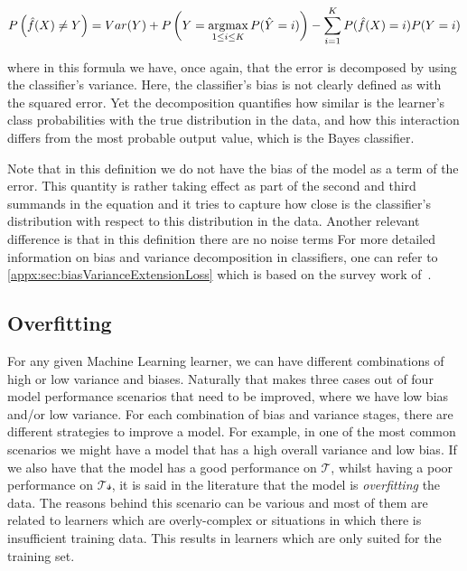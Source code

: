 
$$
P\left( \hat{f}(X) \neq Y \right) =
Var(Y) + %
P\left( Y =  \argmax_{1\leq i \leq K} P(\hat Y = i ) \right) %
-  \sum_{i=1}^K P(\hat{f}(X) =i)P(Y=i) %
$$

where in this formula we have, once again, that the error is decomposed by using the classifier's variance.
Here, the classifier's bias is not clearly defined as with the squared error.
Yet the decomposition quantifies how similar is the learner's class probabilities with the true distribution in the data, and how this interaction differs from the most probable output value, which is the Bayes classifier.

Note that in this definition we do not have the bias of the model as a term of the error.
This quantity is rather taking effect as part of the second and third summands in the equation and it tries to capture how close is the classifier's distribution with respect to this distribution in the data.
Another relevant difference is that in this definition there are no noise terms
For more detailed information on bias and variance decomposition in classifiers, one can refer to \cref{appx:sec:biasVarianceExtensionLoss} which is based on the survey work of~\citep{james-biasVarianceGeneral}.


\subsection{Overfitting}\label{subsection-overfitting}

For any given Machine Learning learner, we can have different combinations of high or low variance and biases.
Naturally that makes three cases out of four model performance scenarios that need to be improved, where we have low bias and/or low variance.
For each combination of bias and variance stages, there are different strategies to improve a model.
For example, in one of the most common scenarios we might have a model that has a high overall variance and low bias.
If we also have that the model has a good performance on $\mathcal{T}$, whilst having a poor performance on $\mathcal{Ts}$, it is said in the literature that the model is \textit{overfitting} the data.
The reasons behind this scenario can be various and most of them are related to learners which are overly-complex or situations in which there is insufficient training data.
This results in learners which are only suited for the training set.

